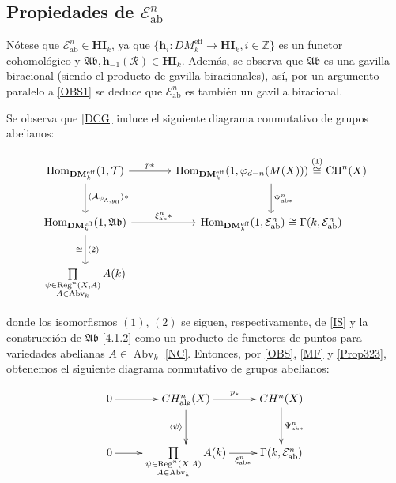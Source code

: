 \documentclass[10pt]{amsart}
\theoremstyle{definition}
\theoremstyle{remark}
\theoremstyle{definition}
\begin{document}
\subsection{Propiedades de  $\mathcal{E}^{n}_{\mathrm{ab}}$}\label{4.1.6}
 Nótese que $\mathcal{E}^{n}_{\mathrm{ab}} \in \mathbf{HI}_{k}$, ya que $\{\mathbf{h}_{i}: DM^{\mathrm{eff}}_{k} \to \mathbf{HI}_{k}, i \in \mathbb{Z}\}$ es un functor cohomológico \cite[Thm. 1.3.6]{BBD82} y $\mathfrak{Ab}, \mathbf{h}_{-1}(\mathcal{R}) \in \mathbf{HI}_{k}$. Además, se observa que $\mathfrak{Ab}$ es una gavilla biracional (siendo el producto de gavilla biracionales), así, por un argumento paralelo a \ref{OBS1} se deduce que $\mathcal{E}^{n}_{\mathrm{ab}}$ es también un gavilla biracional.


Se observa que \ref{DCG} induce el siguiente diagrama conmutativo de grupos abelianos:


\begingroup{}
\[
\begin{tikzcd}[column sep=large, row sep=large]
\mathrm{Hom}_{\mathbf{DM}^{\mathrm{eff}}_k}(1, \mathcal{T}) \arrow[r, "p\ast"] \arrow[d,  "\langle \mathcal{A}_{\psi_{\Lambda,y_{0}}} \rangle \ast"] 
  & \mathrm{Hom}_{\mathbf{DM}^{\mathrm{eff}}_k}(1, \varphi_{d - n}(M(X))) 
      \arrow[d, "\Psi^{n}_{\mathrm{ab\ast}}"]
 \overset{\text{(1)}}{ \cong}\mathrm{CH}^n(X) \\
\mathrm{Hom}_{\mathbf{DM}^{\mathrm{eff}}_k}(1, \mathfrak{Ab}) 
  \arrow[d, "\cong"', "(2)"] 
  \arrow[r, "\xi^{n}_{\mathrm{ab}}\ast"] 
  & \mathrm{Hom}_{\mathbf{DM}^{\mathrm{eff}}_k}(1, \mathcal{E}^{n}_{\mathrm{ab}}) 
   \cong\Gamma(k, \mathcal{E}^{n}_{\mathrm{ab}}) \\
\prod \limits_{\substack{\psi \in \operatorname{Reg}^n (X,A) \\
	A \in \operatorname{Abv}_k}} A(k)
\end{tikzcd}
\]\label{4.1.7}

donde los isomorfismos $(1)$, $(2)$ se siguen, respectivamente, de \ref{IS} y la construcción de $\mathfrak{Ab}$ \ref{4.1.2} como un producto de functores de puntos para variedades abelianas $A \in \operatorname{Abv}_{k}$ \ref{NC}. Entonces, por \ref{OBS}, \ref{MF} y \ref{Prop323}, obtenemos el siguiente diagrama conmutativo de grupos abelianos:

\begin{align}  \label{diag.final.ind.abeq}
\begin{split}
\xymatrix{0 \ar[r]& CH^n_{\mathrm{alg}}(X) \ar[r]^-{p_\ast}
 \ar[d]_-{\langle \psi \rangle} & CH^n (X) 
\ar[d]^-{\Psi ^n _{\mathrm{ab} \ast}} \\
0 \ar[r]& 
\prod \limits_{\substack{\psi \in \operatorname{Reg}^n (X,A) \\
	A \in \operatorname{Abv}_k}}
A(k) \ar[r]_-{\xi ^n _{\mathrm{ab} \ast}} & \Gamma (k, \mathcal E ^n _{\mathrm{ab}})}
\end{split}
\end{align}
\end{document}
